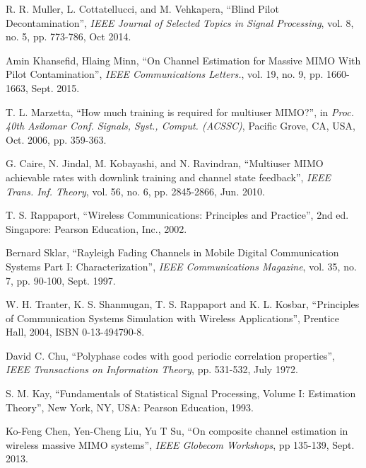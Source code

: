 \documentclass[10pt,journal,comsoc,final]{IEEEtran}
\begin{document}
\begin{thebibliography}{1}
R. R. Muller, L. Cottatellucci, and M. Vehkapera, \textquotedblleft{Blind Pilot Decontamination\textquotedblright}, \emph{IEEE Journal of Selected Topics in Signal Processing}, vol. 8, no. 5, pp. 773-786, Oct 2014.

Amin Khansefid, Hlaing Minn, 
\textquotedblleft{On Channel Estimation for Massive MIMO With Pilot Contamination\textquotedblright}, \emph{IEEE Communications Letters.}, vol. 19, no. 9, pp. 1660-1663, Sept. 2015.



T. L. Marzetta, \textquotedblleft{How much training is required for multiuser MIMO?\textquotedblright}, in \emph{Proc. 40th Asilomar Conf. Signals, Syst., Comput. (ACSSC)}, Pacific Grove, CA, USA, Oct. 2006, pp. 359-363.

G. Caire, N. Jindal, M. Kobayashi, and N. Ravindran, \textquotedblleft{Multiuser MIMO achievable rates with downlink training and channel state feedback\textquotedblright}, \emph{IEEE Trans. Inf. Theory}, vol. 56, no. 6, pp. 2845-2866, Jun. 2010.

T. S. Rappaport, \textquotedblleft{Wireless Communications: Principles and Practice\textquotedblright}, 2nd ed. Singapore: Pearson Education, Inc., 2002.

Bernard Sklar, \textquotedblleft{Rayleigh Fading Channels in Mobile Digital Communication Systems Part I: Characterization\textquotedblright}, \emph{IEEE Communications Magazine}, vol. 35, no. 7, pp. 90-100, Sept. 1997.

W. H. Tranter, K. S. Shanmugan, T. S. Rappaport and K. L. Kosbar, \textquotedblleft{Principles of Communication Systems Simulation with Wireless Applications\textquotedblright}, Prentice Hall, 2004, ISBN 0-13-494790-8.

David C. Chu, \textquotedblleft{Polyphase codes with good periodic correlation properties\textquotedblright}, \emph{IEEE Transactions on Information Theory}, pp. 531-532, July 1972.

S. M. Kay, \textquotedblleft{Fundamentals of Statistical Signal Processing, Volume I: Estimation Theory\textquotedblright}, New York, NY, USA: Pearson Education, 1993.

Ko-Feng Chen, Yen-Cheng Liu, Yu T Su, \textquotedblleft{On composite channel estimation in wireless massive MIMO systems\textquotedblright}, \emph{IEEE Globecom Workshops}, pp 135-139, Sept. 2013.

\end{thebibliography}
 
\end{document}
